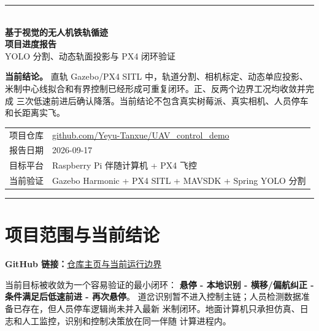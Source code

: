 \documentclass[UTF8,a4paper,11pt,fontset=windows]{ctexart}
\newcommand{\githublink}[2]{%
  \par\smallskip
  \noindent\colorbox{sky}{%
    \parbox{\dimexpr\linewidth-2\fboxsep}{%
      \small\textbf{GitHub 链接：}\href{#1}{\textcolor{linkblue}{#2}}}}
  \par\smallskip}
\begin{document}
\begin{titlepage}
\thispagestyle{empty}
\vspace*{18mm}
{\color{navy}\rule{\linewidth}{1.5pt}}\\[12mm]
{\Huge\bfseries 基于视觉的无人机铁轨循迹\\[4mm]
项目进度报告}\\[8mm]
{\Large YOLO 分割、动态轨面投影与 PX4 闭环验证}\\[12mm]

\vfill
\begin{minipage}{\linewidth}
\colorbox{softamber}{\parbox{\dimexpr\linewidth-2\fboxsep}{%
\textbf{当前结论。} 直轨 Gazebo/PX4 SITL 中，轨道分割、相机标定、动态单应投影、
米制中心线拟合和有界控制已经形成可重复闭环。正、反两个边界工况均收敛并完成
三次低速前进后确认降落。当前结论不包含真实树莓派、真实相机、人员停车和长距离实飞。}}
\end{minipage}

\vfill
\begin{tabularx}{\linewidth}{@{}lX@{}}
项目仓库 & \href{https://github.com/Yeyu-Tanxue/UAV_control_demo}{%
\textcolor{linkblue}{github.com/Yeyu-Tanxue/UAV\_control\_demo}} \\
报告日期 & 2026-09-17 \\
目标平台 & Raspberry Pi 伴随计算机 + PX4 飞控 \\
当前验证 & Gazebo Harmonic + PX4 SITL + MAVSDK + Spring YOLO 分割 \\
\end{tabularx}
\vspace{8mm}
{\color{navy}\rule{\linewidth}{1.5pt}}
\end{titlepage}

\tableofcontents
\clearpage

\section{项目范围与当前结论}
\githublink{https://github.com/Yeyu-Tanxue/UAV_control_demo/blob/main/README.md}
{仓库主页与当前运行边界}

当前目标被收敛为一个容易验证的最小闭环：
\textbf{悬停 - 本地识别 - 横移/偏航纠正 - 条件满足后低速前进 - 再次悬停}。
道岔识别暂不进入控制主链；人员检测数据准备已存在，但人员停车逻辑尚未并入最新
米制闭环。地面计算机只承担仿真、日志和人工监控，识别和控制决策放在同一伴随
计算进程内。
\end{document}
